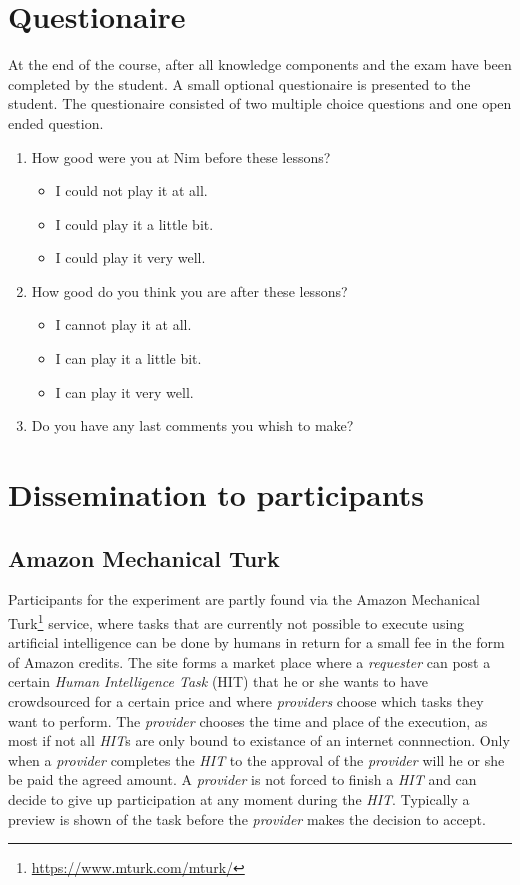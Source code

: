 \section{Questionaire}
\label{sec:setup_questionaire}
At the end of the course, after all knowledge components and the exam have been
completed by the student. A small optional questionaire is presented to the
student. The questionaire consisted of two multiple choice questions and one
open ended question.
\begin{enumerate}
	\item How good were you at Nim before these lessons?
		\begin{itemize}
			\item I could not play it at all.
			\item I could play it a little bit.
			\item I could play it very well.
		\end{itemize}
	\item How good do you think you are after these lessons?
		\begin{itemize}
			\item I cannot play it at all.
			\item I can play it a little bit.
			\item I can play it very well.
		\end{itemize}
	\item Do you have any last comments you whish to make?
\end{enumerate}
\section{Dissemination to participants}
\label{sec:setup_dissemination}
\subsection{Amazon Mechanical Turk}
Participants for the experiment are partly found via the Amazon Mechanical
Turk\footnote{\url{https://www.mturk.com/mturk/}} service, where tasks that are
currently not possible to execute using artificial intelligence can be done by
humans in return for a small fee in the form of Amazon credits. The site forms
a market place where a \emph{requester} can post a certain \emph{Human
Intelligence Task} (HIT) that he or she wants to have crowdsourced for a
certain price and where \emph{providers} choose which tasks they want to perform.
The \emph{provider} chooses the time and place of the execution, as most if not
all \emph{HIT}s are only bound to existance of an internet connnection. Only
when a \emph{provider} completes the \emph{HIT} to the approval of the
\emph{provider} will he or she be paid the agreed amount. A \emph{provider} is
not forced to finish a \emph{HIT} and can decide to give up participation at
any moment during the \emph{HIT}. Typically a preview is shown of the task
before the \emph{provider} makes the decision to accept.

